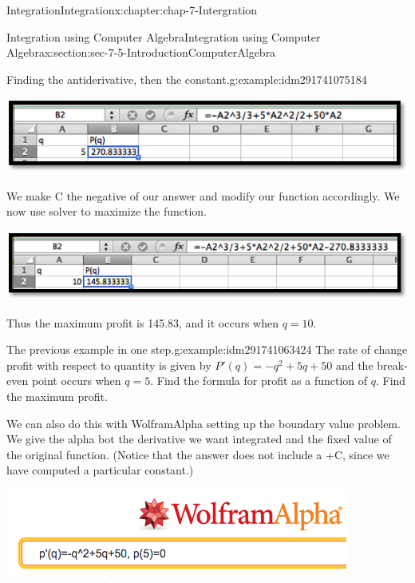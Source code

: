 \documentclass[oneside,10pt,]{book}
\numberwithin{equation}{section}
\begin{document}
\begin{chapterptx}{Integration}{}{Integration}{}{}{x:chapter:chap-7-Intergration}
\begin{sectionptx}{Integration using Computer Algebra}{}{Integration using Computer Algebra}{}{}{x:section:sec-7-5-IntroductionComputerAlgebra}
\begin{example}{Finding the antiderivative, then the constant.}{g:example:idm291741075184}
\begin{sidebyside}{1}{0.15}{0.15}{0}%
\begin{sbspanel}{0.7}%
\includegraphics[width=\linewidth]{images/sec7-5-15.png}
\end{sbspanel}%
\end{sidebyside}%
\par
We make C the negative of our answer and modify our function accordingly.  We now use solver to maximize the function.%
\begin{sidebyside}{1}{0.15}{0.15}{0}%
\begin{sbspanel}{0.7}%
\includegraphics[width=\linewidth]{images/sec7-5-16.png}
\end{sbspanel}%
\end{sidebyside}%
\par
Thus the maximum profit is \textdollar{}145.83, and it occurs when \(q=10\).%
\end{example}
\begin{example}{The previous example in one step.}{g:example:idm291741063424}%
The rate of change profit with respect to quantity is given by \(P' (q)=-q^2+5q+50\) and the break-even point occurs when \(q=5\).  Find the formula for profit as a function of \(q\).  Find the maximum profit.%
\par
We can also do this with Wolfram\textbar{}Alpha setting up the boundary value problem.  We give the alpha bot the derivative we want integrated and the fixed value of the original function.  (Notice that the answer does not include a +C, since we have computed a particular constant.)%
\begin{sidebyside}{1}{0.15}{0.15}{0}%
\begin{sbspanel}{0.7}%
\includegraphics[width=\linewidth]{images/sec7-5-17.png}

\end{sbspanel}
\end{sidebyside}
\end{example}
\end{sectionptx}
\end{chapterptx}
\end{document}

